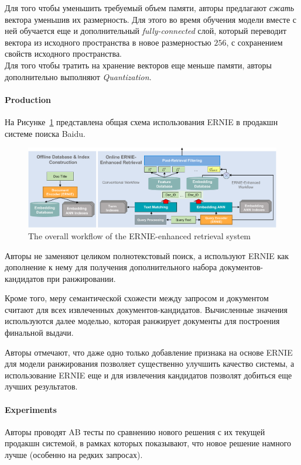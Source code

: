 Для того чтобы уменьшить требуемый объем памяти, авторы предлагают \textit{сжать} вектора уменьшив их размерность.
Для этого во время обучения модели вместе с ней обучается еще и дополнительный \textit{fully-connected} слой, который переводит вектора из исходного пространства в новое размерностью $256$, с сохранением свойств исходного пространства. \\

Для того чтобы тратить на хранение векторов еще меньше памяти, авторы дополнительно выполняют \textit{Quantization}.

\paragraph{Production} На Рисунке~\ref{fig:baidu_system} представлена общая схема использования ERNIE в продакшн системе поиска Baidu.

\begin{figure}[ht]
  \centering
  \includegraphics[width=1.0\linewidth]{figures/baidu-system.pdf}
  \caption{\footnotesize{The overall workflow of the ERNIE-enhanced retrieval system}}
  \label{fig:baidu_system}
\end{figure}

Авторы не заменяют целиком полнотекстовый поиск, а используют ERNIE как дополнение к нему для получения дополнительного набора документов-кандидатов при ранжировании.

Кроме того, меру семантической схожести между запросом и документом считают для всех извлеченных документов-кандидатов.
Вычисленные значения используются далее моделью, которая ранжирует документы для построения финальной выдачи. 

Авторы отмечают, что даже одно только добавление признака на основе ERNIE для модели ранжирования позволяет существенно улучшить качество системы, а использование ERNIE еще и для извлечения кандидатов позволят добиться еще лучших результатов.

\paragraph{Experiments} Авторы проводят AB тесты по сравнению нового решения с их текущей продакшн системой, в рамках которых показывают, что новое решение намного лучше (особенно на редких запросах).

